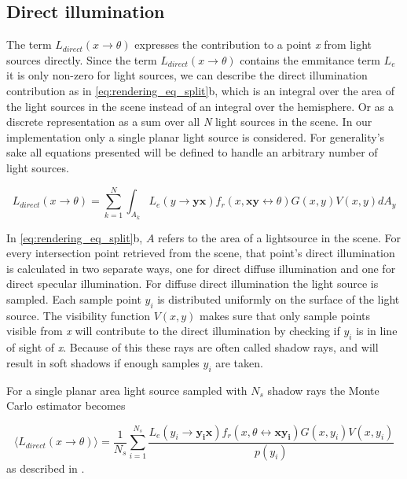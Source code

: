 \documentclass[]{report}   %
\begin{document}
\subsection{Direct illumination}
The term $L_{direct}(x \rightarrow \theta)$ expresses the contribution to a point \emph{x} from light sources directly.
Since the term $L_{direct}(x \rightarrow \theta)$ contains the emmitance term $L_e$ it is only non-zero for light sources, we can describe the direct illumination contribution as in \autoref{eq:rendering_eq_split}b, which is an integral over the area of the light sources in the scene instead of an integral over the hemisphere.
Or as a discrete representation as a sum over all \emph{N} light sources in the scene.
In our implementation only a single planar light source is considered.
For generality's sake all equations presented will be defined to handle an arbitrary number of light sources.

\begin{equation}
\label{eq:disc_direct}
L_{direct}(x \rightarrow \theta) = \sum^{N}_{k=1} \int_{A_k}L_e(y \rightarrow \mathbf{yx}) f_r(x, \mathbf{xy}\leftrightarrow \theta)G(x,y)V(x,y)dA_y
\end{equation}

In \autoref{eq:rendering_eq_split}b, $A$ refers to the area of a lightsource in the scene.
For every intersection point retrieved from the scene, that point's direct illumination is calculated in two separate ways, one for direct diffuse illumination and one for direct specular illumination.
For diffuse direct illumination the light source is sampled.
Each sample point $y_i$ is distributed uniformly on the surface of the light source.
The visibility function $V(x,y)$ makes sure that only sample points visible from \emph{x} will contribute to the direct illumination by checking if $y_i$ is in line of sight of \emph{x}.
Because of this these rays are often called shadow rays, and will result in soft shadows if enough samples $y_i$ are taken.

For a single planar area light source sampled with $N_s$ shadow rays the Monte Carlo estimator becomes

\begin{equation}
\label{eq:monte_carlo_direct}
\langle L_{direct}(x \rightarrow \theta) \rangle = \frac{1}{N_s} \sum^{N_s}_{i=1} \frac{L_e(y_i \rightarrow \mathbf{y_ix}) f_r(x, \theta \leftrightarrow \mathbf{xy_i})G(x,y_i)V(x,y_i)}{p(y_i)}
\end{equation}
as described in \cite{dutre}.
\end{document}
